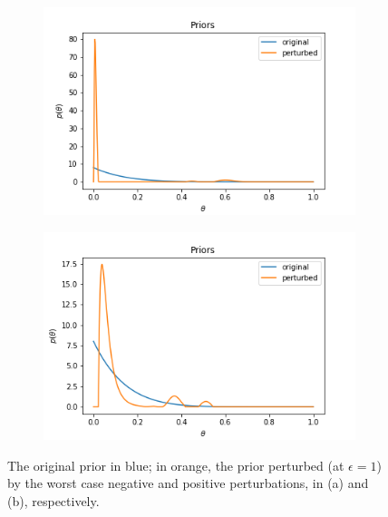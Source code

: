 \documentclass[a4paper]{article}
\begin{document}
\begin{figure}[h!]
	\centering
\begin{subfigure}[t]{0.4\textwidth}
  \includegraphics[width = \textwidth]{./func_sens_results/worst_case_neg_priors.png}
  \subcaption{}
\end{subfigure}
\begin{subfigure}[t]{0.4\textwidth}
  \includegraphics[width = \textwidth]{./func_sens_results/worst_case_pos_priors.png}
  \subcaption{}
\end{subfigure}
  \caption{The original prior in blue; in orange, the prior perturbed (at $\epsilon = 1$) by
  the worst case negative and positive perturbations, in (a) and (b), respectively. }
	\label{fig:worst_case_perturbations}
\end{figure}
\end{document}
